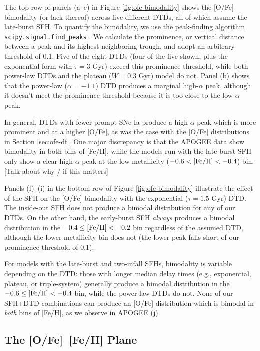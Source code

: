 \documentclass[twocolumn,twocolappendix,linenumbers,trackchanges]{aastex631}
\begin{document}
The top row of panels (a--e) in Figure \ref{fig:ofe-bimodality} shows the [O/Fe] bimodality (or lack thereof) across five different DTDs, all of which assume the late-burst SFH. To quantify the bimodality, we use the peak-finding algorithm {\tt scipy.signal.find\_peaks} \citep{2020SciPy-NMeth}. We calculate the prominence, or vertical distance between a peak and its highest neighboring trough, and adopt an arbitrary threshold of 0.1. Five of the eight DTDs (four of the five shown, plus the exponential form with $\tau=3$ Gyr) exceed this prominence threshold, while both power-law DTDs and the plateau ($W=0.3$ Gyr) model do not. Panel (b) shows that the power-law ($\alpha=-1.1$) DTD produces a marginal high-$\alpha$ peak, although it doesn't meet the prominence threshold because it is too close to the low-$\alpha$ peak. 

In general, DTDs with fewer prompt SNe Ia produce a high-$\alpha$ peak which is more prominent and at a higher [O/Fe], as was the case with the [O/Fe] distributions in Section \ref{sec:ofe-df}. One major discrepancy is that the APOGEE data show bimodality in both bins of [Fe/H], while the models run with the late-burst SFH only show a clear high-$\alpha$ peak at the low-metallicity ($-0.6<{\rm [Fe/H]}<-0.4$) bin. [Talk about why / if this matters]

Panels (f)--(i) in the bottom row of Figure \ref{fig:ofe-bimodality} illustrate the effect of the SFH on the [O/Fe] bimodality with the exponential ($\tau=1.5$ Gyr) DTD. The inside-out SFH does not produce a bimodal distribution for any of our DTDs. On the other hand, the early-burst SFH {\it always} produces a bimodal distribution in the $-0.4\leq{\rm [Fe/H]}<-0.2$ bin regardless of the assumed DTD, although the lower-metallicity bin does not (the lower peak falls short of our prominence threshold of 0.1). 

For models with the late-burst and two-infall SFHs, bimodality is variable depending on the DTD: those with longer median delay times (e.g., exponential, plateau, or triple-system) generally produce a bimodal distribution in the $-0.6\leq{\rm [Fe/H]}<-0.4$ bin, while the power-law DTDs do not. None of our SFH+DTD combinations can produce an [O/Fe] distribution which is bimodal in {\it both} bins of [Fe/H], as we observe in APOGEE (j).

\subsection{The [O/Fe]--[Fe/H] Plane}
\label{sec:ofe-feh}
\end{document}
